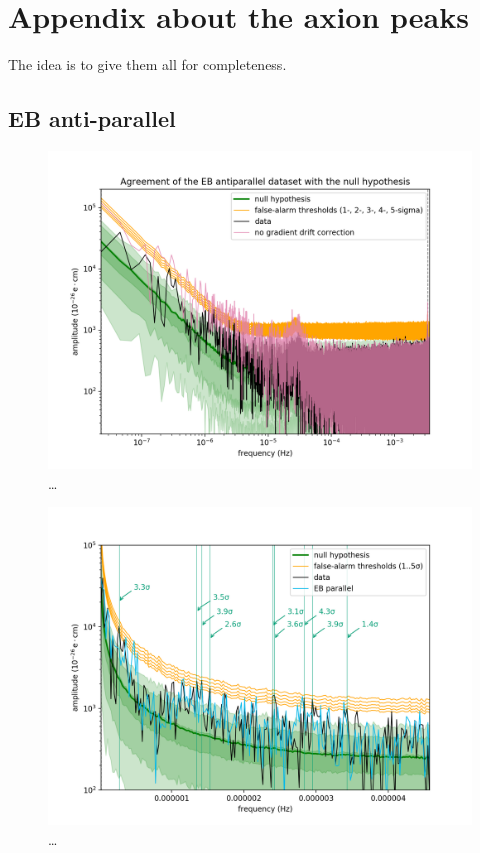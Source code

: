 \chapter{Appendix about the axion peaks}
\label{ch:alp_appendix}

The idea is to give them all for completeness.



\section{EB anti-parallel}
\begin{figure}
  \centering
  \includegraphics[width=\linewidth]{gfx/axions/AP_detection_and_no_GDC.png}
  \caption{\ldots}
  \label{fig:axions_AP_detection_and_no_GDC}
\end{figure}
\begin{figure}
  \centering
  \includegraphics[width=\linewidth]{gfx/axions/AP_detection_area1.png}
  \caption{\ldots}
  \label{fig:axions_AP_detection_area1}
\end{figure}
